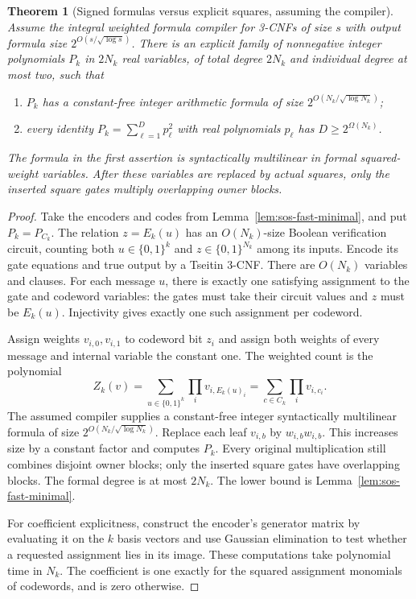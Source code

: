 \documentclass[11pt]{article}
\newtheorem{theorem}{Theorem}[section]
\theoremstyle{definition}
\theoremstyle{remark}
\begin{document}
\begin{theorem}[Signed formulas versus explicit squares, assuming the compiler]
\label{thm:sos-signed-separation}
Assume the integral weighted formula compiler for 3-CNFs of size $s$
with output formula size $2^{O(s/\sqrt{\log s})}$.
There is an explicit family of nonnegative integer polynomials
$P_k$ in $2N_k$ real variables, of total degree $2N_k$ and individual
degree at most two, such that
\begin{enumerate}
\item $P_k$ has a constant-free integer arithmetic formula of size
      $2^{O(N_k/\sqrt{\log N_k})}$;
\item every identity $P_k=\sum_{\ell=1}^{D}p_\ell^2$ with real
      polynomials $p_\ell$ has $D\ge2^{\Omega(N_k)}$.
\end{enumerate}
The formula in the first assertion is syntactically multilinear in
formal squared-weight variables.  After these variables are replaced
by actual squares, only the inserted square gates multiply overlapping
owner blocks.
\end{theorem}
\begin{proof}
Take the encoders and codes from Lemma~\ref{lem:sos-fast-minimal},
and put $P_k=P_{C_k}$.
The relation $z=E_k(u)$ has an $O(N_k)$-size Boolean verification
circuit, counting both $u\in\{0,1\}^k$ and
$z\in\{0,1\}^{N_k}$ among its inputs.
Encode its gate equations and true output by a Tseitin 3-CNF.
There are $O(N_k)$ variables and clauses.  For each message $u$,
there is exactly one satisfying assignment to the gate and codeword
variables: the gates must take their circuit values and $z$ must be
$E_k(u)$.  Injectivity gives exactly one such assignment per codeword.

Assign weights $v_{i,0},v_{i,1}$ to codeword bit $z_i$ and assign both
weights of every message and internal variable the constant one.
The weighted count is the polynomial
\[
 Z_k(v)=\sum_{u\in\{0,1\}^k}\prod_i v_{i,E_k(u)_i}
       =\sum_{c\in C_k}\prod_i v_{i,c_i}.
\]
The assumed compiler supplies a constant-free integer syntactically
multilinear formula of size $2^{O(N_k/\sqrt{\log N_k})}$.
Replace each leaf $v_{i,b}$ by $w_{i,b}w_{i,b}$.
This increases size by a constant factor and computes $P_k$.
Every original multiplication still combines disjoint owner blocks;
only the inserted square gates have overlapping blocks.
The formal degree is at most $2N_k$.
The lower bound is Lemma~\ref{lem:sos-fast-minimal}.

For coefficient explicitness, construct the encoder's generator
matrix by evaluating it on the $k$ basis vectors and use Gaussian
elimination to test whether a requested assignment lies in its image.
These computations take polynomial time in $N_k$.
The coefficient is one exactly for the squared assignment monomials
of codewords, and is zero otherwise.
\end{proof}
\end{document}
